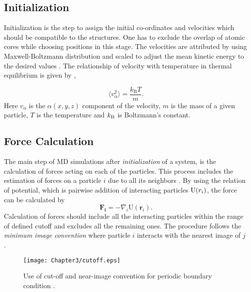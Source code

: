 \subsection{Initialization} \label{Initial-MD}
\begin{sloppypar}
Initialization is the step to assign the initial co-ordinates and velocities which should be compatible to the structures. One has to exclude the overlap of atomic cores while choosing positions in this stage. The velocities are attributed by using Maxwell-Boltzmann distribution and scaled to adjust the mean kinetic energy to the desired values \citep{Gromacs-manual}. The relationship of velocity with temperature in thermal equilibrium is given by \citep{Frenkel2002},
\end{sloppypar}
\vspace{-25pt}
\begin{equation}
\langle v_\alpha^2 \rangle = \frac{k_{\text{B}} T}{m}.
\end{equation}
Here $v_\alpha$ is the $\alpha(x,y,z)$ component of the velocity, $m$ is the mass of a given particle, $T$ is the temperature and $k_{\rm B}$ is Boltzmann's constant. 
\subsection{Force Calculation}
\begin{sloppypar}
The main step of MD simulations after {\it initialization} of a system, is the calculation of forces acting on each of the particles. This process includes the estimation of forces on a particle $i$ due to all its neighbors \citep{Ercolessi1997}. By using the relation of potential, which is pairwise addition of interacting particles ${\rm U}(r_i)$, the force can be calculated by
\begin{equation}
\mathbf{F_i} = -\nabla_i\textrm{U}(\mathbf{r}_i).
\end{equation}
Calculation of forces should include all the interacting particles within the range of defined cutoff and excludes all the remaining ones. 
The procedure follows the {\it minimum image convention} where particle $i$ interacts with the nearest image of $j$ \citep{Frenkel2002, Ercolessi1997}. \end{sloppypar}

\begin{figure}[h!]
\centering 
\texttt{[image: Chapter3/cutoff.eps]}
\label{cutoff}
\caption[Cut-off and near-image convention for periodic boundary condition. ]{Use of cut-off and near-image convention for periodic boundary condition \citep{Frenkel2002}.}
\end{figure}

